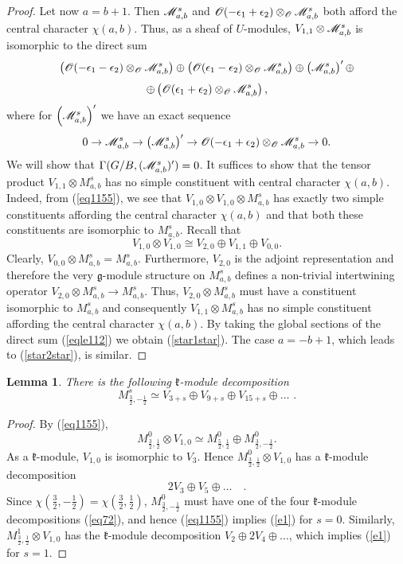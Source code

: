 \documentclass[12pt]{amsart}
\theoremstyle{plain} %
\newtheorem{lemma}[definition]{Lemma}
\newcommand{\kk}{\mathfrak{k}}
\renewcommand{\gg}{\mathfrak{g}}
\newcommand {\OO} {\mathscr {O}}
\newcommand{\eps}{\epsilon}
\newcommand{\half}{\frac{1}{2}}
\newcommand{\threehalfs}{\frac{3}{2}}
\newcommand{\refeq}[1]{(\ref{#1})}
\newcommand {\univ} {U}
\begin{document}
\begin{proof}
Let now $a=b+1$. Then $\mathscr {M}_{a,b}^s$ and $\OO(-\eps_1+\eps_2)\otimes_\OO\mabs$
both afford the central character $\chi (a,b)$. Thus, as a sheaf of
$\univ$-modules,
$V_{1,1}\otimes\mathscr {M}_{a,b}^s$ is isomorphic to the direct sum
\begin{equation}\label{eqle112}
\left(\OO(-\eps_1-\eps_2)\otimes_\OO \mabs\right) \oplus \left(\OO(\eps_1-\eps_2)\otimes_\OO\mabs\right)\oplus \left(\mabs\right)' \oplus
\end{equation}
\[
\oplus\left( \OO(\eps_1+\eps_2)\otimes_\OO\mabs\right),
\]
where for $\left(\mathscr {M}_{a,b}^s\right)'$ we have an exact sequence
\[
0\to\mabs\to\left(\mabs\right)'\to\OO(-\eps_1+\eps_2)\otimes_\OO\mabs\to 0.
\]
We will show that $\Gamma(G/B,(\mathscr {M}_{a,b}^s)')=0$. It suffices to show that
the tensor product $V_{1,1}\otimes M^s_{a,b}$ has no simple constituent with central character $\chi (a,b)$. Indeed, from \refeq{eq1155}, we see that $V_{1,0}\otimes V_{1,0}\otimes M^s_{a,b}$ has exactly two simple constituents affording the central character $\chi (a,b)$ and that both these constituents are isomorphic to $M^s_{a,b}$. Recall that
\begin{equation*}%
V_{1,0}\otimes V_{1,0}\cong V_{2,0}\oplus V_{1,1}\oplus V_{0,0}.
\end{equation*}
Clearly, $V_{0,0}\otimes M^s_{a,b}=M^s_{a,b}$. Furthermore, $V_{2,0}$ is the adjoint representation and therefore the very $\gg$-module structure on $M^s_{a,b}$ defines a non-trivial intertwining operator $V_{2,0}\otimes M^s_{a,b}\to M^s_{a,b}$. Thus, $V_{2,0}\otimes M^s_{a,b}$ must have a constituent isomorphic to $M^s_{a,b}$ and consequently $V_{1,1}\otimes M^s_{a,b}$ has no simple constituent affording the central character $\chi(a,b)$. By taking the global sections of the direct sum \refeq{eqle112} we obtain \refeq{star1star}. The case $a=-b+1$, which leads to \refeq{star2star}, is similar.
\end{proof}

\begin{lemma}\label{le201}
There is the following $\kk$-module decomposition
\begin{equation} \label {e1}
M_{\threehalfs,-\half}^{s}\simeq V_{3+s}\oplus V_{9+s}\oplus V_{15+s}\oplus\dots\text{ .}
\end{equation}
\end{lemma}
\begin {proof}
By \refeq{eq1155},
\[
M_{\threehalfs,\half}^{0}\otimes V_{1,0}\simeq M_{\frac{5}{2},\half}^0\oplus M_{\threehalfs,-\half}^0.
\]
As a $\kk$-module, $V_{1,0}$ is isomorphic to $V_3$. Hence $M_{\threehalfs,\half}^{0}\otimes V_{1,0}$ has a $\kk$-module decomposition
\[
\label{e3}
2V_3\oplus V_5\oplus \dots\quad .
\]
Since $\chi(\threehalfs, -\half)=\chi(\threehalfs,\half)$, $M_{\threehalfs,-\half}^0$ must have one of the four $\kk$-module decompositions \refeq{eq72}, and hence \refeq{eq1155} implies \refeq{e1} for $s=0$. Similarly, $M_{\threehalfs,\half}^1\otimes V_{1,0}$ has the $\kk$-module decomposition $V_2\oplus 2V_4\oplus \dots$, which implies \refeq{e1} for $s=1$.
\end{proof}
\end{document}
